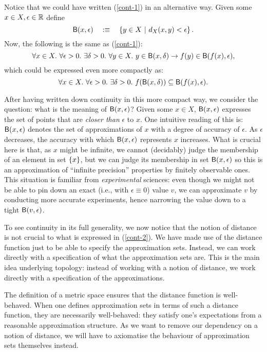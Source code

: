 Notice that we could have written (\ref{cont-1}) in an alternative way. Given some $x \in X,
\epsilon \in \mathbb{R}{}$ define
\begin{equation*}
  \mathsf{B}(x, \epsilon) \quad:\equiv\quad \left\{  y \in X ~|~ d_X(x, y) < \epsilon  \right\}.
\end{equation*}
Now, the following is the same as (\ref{cont-1}):
\begin{equation*}
  \forall x \in X.~ \forall \epsilon > 0.~ \exists \delta > 0.~ \forall y \in X.~ y \in \mathsf{B}(x, \delta) \rightarrow f(y) \in \mathsf{B}(f(x), \epsilon),
\end{equation*}
which could be expressed even more compactly as:
\begin{equation}\label{cont-2}
  \forall x \in X.~ \forall \epsilon > 0.~ \exists \delta > 0.~ f(\mathsf{B}(x, \delta)) \subseteq \mathsf{B}(f(x), \epsilon).
\end{equation}

After having written down continuity in this more compact way, we consider the question:
what is the meaning of $\mathsf{B}(x, \epsilon)$? Given some $x \in X$, $\mathsf{B}(x, \epsilon)$ expresses the set
of points that are \emph{closer than} $\epsilon$ to $x$. One intuitive reading of this is:
$\mathsf{B}(x, \epsilon)$ denotes the set of approximations of $x$ with a degree of accuracy of $\epsilon$.
As $\epsilon$ decreases, the accuracy with which $\mathsf{B}(x, \epsilon)$ represents $x$ increases. What is
crucial here is that, as $x$ might be infinite, we cannot (decidably) judge the membership
of an element in set $\left\{  x  \right\}$, but we can judge its membership in set $\mathsf{B}(x, \epsilon)$
so this is an approximation of ``infinite precision'' properties by finitely observable
ones. This situation is familiar from \emph{experimental} sciences: even though we might
not be able to pin down an exact (i.e., with $\epsilon \equiv 0$) value $v$, we can approximate $v$ by
conducting more accurate experiments, hence narrowing the value down to a tight
$\mathsf{B}(v, \epsilon)$.

To see continuity in its full generality, we now notice that the notion of distance is not
crucial to what is expressed in (\ref{cont-2}). We have made use of the distance function
just to be able to specify the approximation sets. Instead, we can work directly with a
specification of what the approximation sets are. This is the main idea underlying
topology: instead of working with a notion of distance, we work directly with a
specification of the approximations.

The definition of a metric space ensures that the distance function is well-behaved. When
one defines approximation sets in terms of such a distance function, they are necessarily
well-behaved: they satisfy one's expectations from a reasonable approximation structure.
As we want to remove our dependency on a notion of distance, we will have to axiomatise
the behaviour of approximation sets themselves instead.

